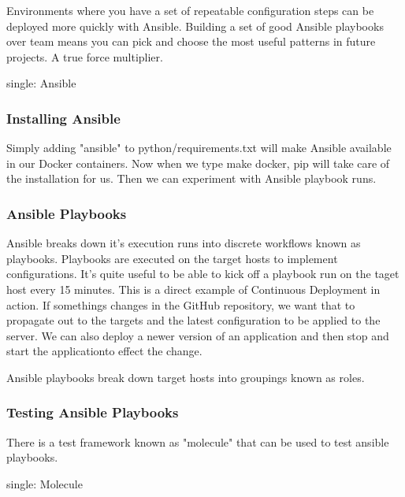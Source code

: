 \justify
Environments where you have a set of repeatable configuration steps can
be deployed more quickly with Ansible. Building a set of good Ansible
playbooks over team means you can pick and choose the most useful
patterns in future projects. A true force multiplier.

single: Ansible

\hypertarget{installing-ansible}{%
   \subsubsection{Installing Ansible}\label{installing-ansible}}

Simply adding "ansible" to python/requirements.txt will make Ansible
available in our Docker containers. Now when we type make docker, pip
will take care of the installation for us. Then we can experiment with
Ansible playbook runs.

\hypertarget{ansible-playbooks}{%
   \subsubsection{Ansible Playbooks}\label{ansible-playbooks}}

Ansible breaks down it's execution runs into discrete workflows known as
playbooks. Playbooks are executed on the target hosts to implement
configurations. It's quite useful to be able to kick off a playbook run
on the taget host every 15 minutes. This is a direct example of
Continuous Deployment in action. If somethings changes in the GitHub
repository, we want that to propagate out to the targets and the latest
configuration to be applied to the server. We can also deploy a newer
version of an application and then stop and start the applicationto
effect the change.

Ansible playbooks break down target hosts into groupings known as roles.

\hypertarget{testing-ansible-playbooks}{%
   \subsubsection{Testing Ansible
      Playbooks}\label{testing-ansible-playbooks}}

There is a test framework known as "molecule" that can be used to test
ansible playbooks.

single: Molecule

\begin{Shaded}
   \begin{Highlighting}[]
      \NormalTok{$ }
      \ExtensionTok{--}\OperatorTok{>}
   \end{Highlighting}
\end{Shaded}


